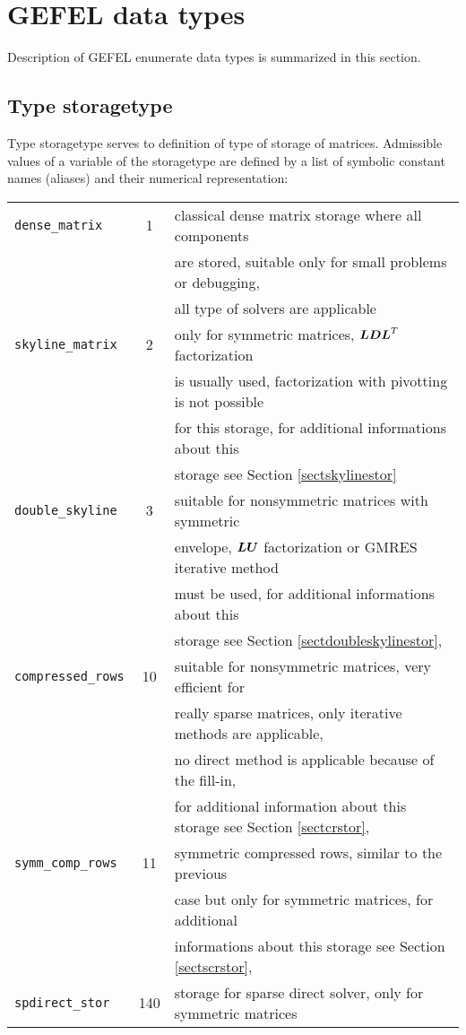 \chapter{GEFEL data types}

Description of GEFEL enumerate data types is summarized in this section. 

\section{Type {\sf storagetype}}
\label{sectstoragetype}
Type {\sf storagetype} serves to definition of type of storage of matrices.
Admissible values of a variable of the {\sf storagetype} are defined by a list of symbolic constant names (aliases)
and their numerical representation:

\begin{center}
\begin{tabular}{|l|c|l|}
\hline
{\tt dense\_matrix} & 1 & classical dense matrix storage where all components
\\
 & & are stored, suitable only for small problems or debugging,
\\
 & & all type of solvers are applicable
\\ \hline
{\tt skyline\_matrix} & 2 & only for symmetric matrices, $\mbox{\boldmath$LDL$}^T$ factorization
\\
 & & is usually used, factorization with pivotting is not possible
\\
 & & for this storage, for additional informations about this
\\
 & & storage see Section \ref{sectskylinestor}
\\ \hline
{\tt double\_skyline} & 3 & suitable for nonsymmetric matrices with symmetric
\\
 & & envelope, $\mbox{\boldmath$LU$}$ factorization or GMRES iterative method
\\
 & & must be used, for additional informations about this
\\
 & & storage see Section \ref{sectdoubleskylinestor},
\\ \hline
{\tt compressed\_rows} & 10 & suitable for nonsymmetric matrices, very efficient for
\\
 & & really sparse matrices, only iterative methods are applicable,
\\
 & & no direct method is applicable because of the fill-in,
\\
 & & for additional information about this storage see Section \ref{sectcrstor},
\\ \hline
{\tt symm\_comp\_rows} & 11 & symmetric compressed rows, similar to the previous
\\
 & & case but only for symmetric matrices, for additional
\\
 & & informations about this storage see Section \ref{sectscrstor},
\\ \hline
{\tt spdirect\_stor} & 140 & storage for sparse direct solver, only for symmetric matrices
\\ \hline
\end{tabular}
\end{center}

